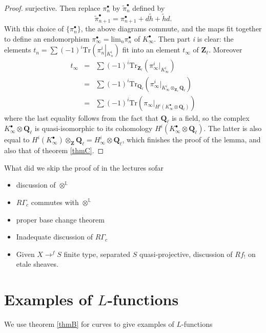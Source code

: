 \begin{proof}
surjective. Then replace $\pi_n^\bullet$ by $\tilde\pi_n^\bullet$ defined by
$$
\tilde\pi_{n+1}^\bullet = \pi_{n+1}^\bullet + d\tilde h+\tilde hd.
$$
With this choice of $\{\pi_n^\bullet\}$, the above diagrams commute, and the
maps fit together to define an endomorphism $\pi_\infty^\bullet =
\text{lim}_n\pi_n^\bullet$ of $K_\infty^\bullet$. Then part {\it i} is clear:
the elements $t_n = \sum(-1)^i
\text{Tr}\left(\pi_n^i\left|_{K_n^i}\right.\right)$ fit into an element
$t_\infty$ of $\mathbf{Z}_\ell$. Moreover
\begin{eqnarray*}
t_\infty & = & \sum(-1)^i
\text{Tr}_{\mathbf{Z}_\ell}\left(\pi_\infty^i\big|_{K_\infty^i}\right) \\
& = & \sum(-1)^i
\text{Tr}_{\mathbf{Q}_\ell}\left(\pi_\infty^i\big|_{K_\infty^i\otimes_{\mathbf{Z
}_\ell}\mathbf{Q}_\ell}\right)\\
& =
&\sum(-1)^i\text{Tr}\left(\pi_\infty\big|_{H^i(K_\infty^\bullet\otimes\mathbf{Q}
_\ell)}\right)
\end{eqnarray*}
where the last equality follows from the fact that $\mathbf{Q}_\ell$ is a
field, so the complex $K_\infty^\bullet\otimes\mathbf{Q}_\ell$ is
quasi-isomorphic to its cohomology
$H^i(K_\infty^\bullet\otimes\mathbf{Q}_\ell)$. The latter is also equal to
$H^i(K_\infty^\bullet)\otimes_{\mathbf{Z}}\mathbf{Q}_\ell = H_\infty^i\otimes
\mathbf{Q}_\ell$, which finishes the proof of the lemma, and also that of
theorem \ref{thmC}.
\end{proof}

\noindent
What did we skip the proof of in the lectures sofar
\begin{itemize}
\item discussion of $\otimes^{\mathbb{L}}$
\item $R\Gamma_c$ commutes with $\otimes^{\mathbb L}$
\item proper base change theorem
\item Inadequate discussion of $R\Gamma_c$
\item Given $X\to^f S$ finite type, separated $S$ quasi-projective, discussion
of $Rf_!$ on etale sheaves.
\end{itemize}


\section{Examples of $L$-functions}

We use theorem \ref{thmB} for curves to give examples of $L$-functions

